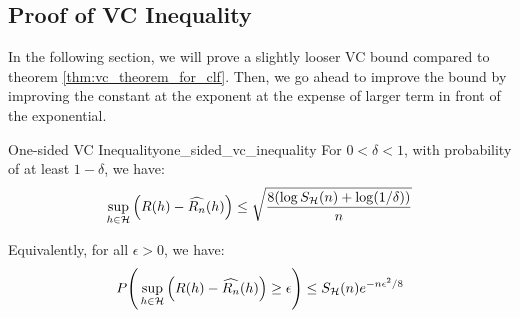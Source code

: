 \subsection{Proof of VC Inequality}
\label{sec:proof_of_vc_inequality}

In the following section, we will prove a slightly looser VC bound compared to theorem \ref{thm:vc_theorem_for_clf}. Then, we go ahead to improve the bound by improving the constant at the exponent at the expense of larger term in front of the exponential.

\begin{theorem}{One-sided VC Inequality}{one_sided_vc_inequality}
    For $0 < \delta < 1$, with probability of at least $1-\delta$, we have:
    \begin{align*}
        \sup_{h\in\mathcal{H}} \Big( 
            R(h) - \widehat{R_n}(h)
         \Big) \le \sqrt{
            \frac{8(\log S_{\mathcal{H}}(n) + \log(1/\delta))}{n}
        }
    \end{align*}

    \noindent Equivalently, for all $\epsilon>0$, we have:
    \begin{align*}
        P\Bigg( 
            \sup_{h\in\mathcal{H}} \Big( 
                R(h) - \widehat{R_n}(h)
             \Big) \ge \epsilon
         \Bigg) \le S_{\mathcal{H}}(n)e^{-n\epsilon^2/8}
    \end{align*}
\end{theorem}

